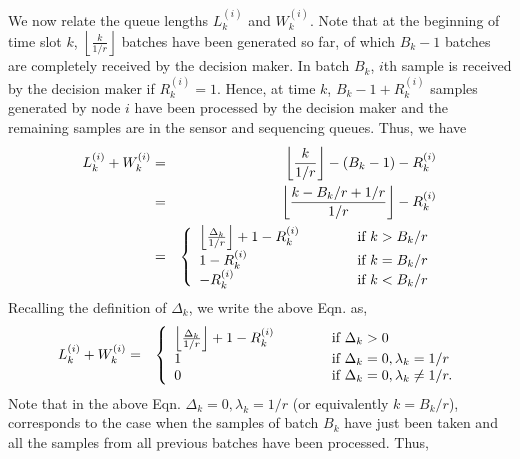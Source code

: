 \documentclass[acmtosn]{acmtrans2m}
\begin{document}
We now relate the queue lengths $L_k^{(i)}$ and $W_k^{(i)}$. Note that 
at the beginning of time slot $k$, $\left\lfloor\frac{k}{1/r}\right\rfloor$ 
batches have been generated so far, of which $B_k - 1$ batches are 
completely received by the decision maker. In batch $B_k$, $i$th sample
is received by the decision maker if $R_k^{(i)} = 1$. Hence, at time
$k$, $B_k - 1 + R_k^{(i)}$ samples generated by node $i$ 
have been processed by the decision maker and the remaining samples are in the 
sensor and sequencing queues. Thus, we have 
\begin{eqnarray}
     \label{eqn:L-W}
     L_k^{(i)} + W_k^{(i)} & = & \left\lfloor\frac{k}{1/r}\right\rfloor - \left(B_k - 1\right) - R_k^{(i)} \\
      & = & \left\lfloor\frac{k - B_k/r + 1/r}{1/r}\right\rfloor   - R_k^{(i)} \nonumber \\ 
      & = & \left\{
            \begin{array}{ll}
\left\lfloor\frac{\Delta_k}{1/r}\right\rfloor  + 1 - R_k^{(i)} & \hspace{11mm}\text{if} \ k > B_k/r \\
1 - R_k^{(i)} & \hspace{11mm}\text{if} \ k = B_k/r \\
- R_k^{(i)} & \hspace{11mm}\text{if} \ k < B_k/r 
            \end{array}
\right. \nonumber 
     \end{eqnarray}
Recalling the definition of $\Delta_k$, we write the above Eqn. as, 
     \begin{eqnarray}
     \label{eqn:L-W-D}
     L_k^{(i)} + W_k^{(i)} 
      & = & \left\{
            \begin{array}{ll}
\left\lfloor\frac{\Delta_k}{1/r}\right\rfloor  + 1 - R_k^{(i)} & \hspace{11mm}\text{if} \ \Delta_k > 0 \\
1  & \hspace{11mm}\text{if} \ \Delta_k = 0, \lambda_k = 1/r \\
0 & \hspace{11mm}\text{if} \ \Delta_k = 0, \lambda_k \neq 1/r. 
            \end{array}
\right.
     \end{eqnarray}
Note that in the above Eqn. $\Delta_k=0,\lambda_k=1/r$ (or equivalently $k=B_k/r$), 
corresponds to the case when the samples of batch $B_k$ have just been taken 
and all the samples from all previous batches have been processed. Thus,
\end{document}
